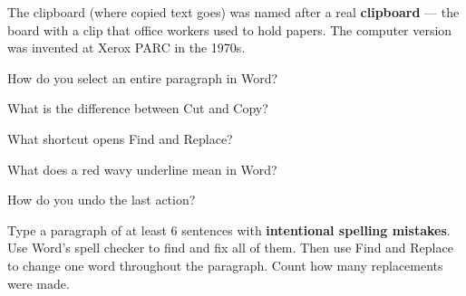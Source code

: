 \begin{funfact}
The clipboard (where copied text goes) was named after a real \textbf{clipboard} --- the board with a clip that office workers used to hold papers. The computer version was invented at Xerox PARC in the 1970s.
\end{funfact}

\begin{reviewqs}
  \item How do you select an entire paragraph in Word?
  \item What is the difference between Cut and Copy?
  \item What shortcut opens Find and Replace?
  \item What does a red wavy underline mean in Word?
  \item How do you undo the last action?
\end{reviewqs}

\begin{challenge}
Type a paragraph of at least 6 sentences with \textbf{intentional spelling mistakes}. Use Word's spell checker to find and fix all of them. Then use Find and Replace to change one word throughout the paragraph. Count how many replacements were made.
\end{challenge}
